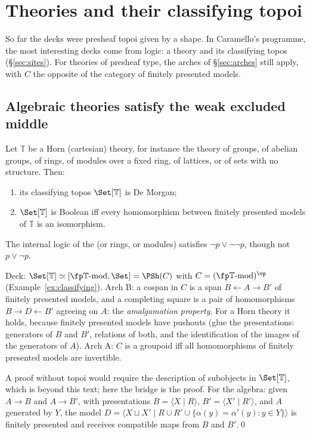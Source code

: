 \section{Theories and their classifying topoi}\label{sec:theories}

So far the decks were presheaf topoi given by a shape. In Caramello's programme, the most interesting decks come from logic: a theory and its classifying topos (\S\ref{sec:sites}). For theories of presheaf type, the arches of \S\ref{sec:arches} still apply, with $C$ the opposite of the category of finitely presented models.

\subsection{Algebraic theories satisfy the weak excluded middle}

\begin{theorem}\label{th:horn}
Let $\mathbb T$ be a Horn (cartesian) theory, for instance the theory of groups, of abelian groups, of rings, of modules over a fixed ring, of lattices, or of sets with no structure. Then:
\begin{enumerate}
\item its classifying topos $\Set[\mathbb T]$ is De Morgan;
\item $\Set[\mathbb T]$ is Boolean iff every homomorphism between finitely presented models of $\mathbb T$ is an isomorphism.
\end{enumerate}
\end{theorem}

\inwords{} The internal logic of the  (or rings, or modules) satisfies $\neg p\vee\neg\neg p$, though not $p\vee\neg p$.

\gen{} Deck: $\Set[\mathbb T]\simeq[\fp\mathbb T\text{-mod},\Set] = \PSh(C)$ with $C = (\fp\mathbb T\text{-mod})^{\op}$ (Example~\ref{ex:classifying}). Arch B: a cospan in $C$ is a span $B\leftarrow A\rightarrow B'$ of finitely presented models, and a completing square is a pair of homomorphisms $B\to D\leftarrow B'$ agreeing on $A$: the \emph{amalgamation property}. For a Horn theory it holds, because finitely presented models have pushouts (glue the presentations: generators of $B$ and $B'$, relations of both, and the identification of the images of the generators of $A$). Arch A: $C$ is a groupoid iff all homomorphisms of finitely presented models are invertible.

\direct{} A proof without topoi would require the description of subobjects in $\Set[\mathbb T]$, which is beyond this text; here the bridge is the proof. For the algebra: given $A\to B$ and $A\to B'$, with presentations $B = \langle X\mid R\rangle$, $B' = \langle X'\mid R'\rangle$, and $A$ generated by $Y$, the model $D = \langle X\sqcup X'\mid R\cup R'\cup\{\alpha(y) = \alpha'(y) : y\in Y\}\rangle$ is finitely presented and receives compatible maps from $B$ and $B'$.\qed


